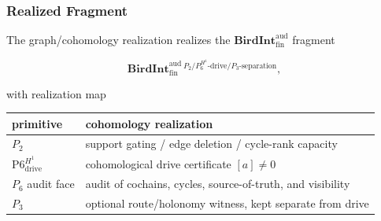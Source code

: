 \documentclass[11pt]{article}
\theoremstyle{definition}
\begin{document}
\subsubsection{Realized Fragment}

The graph/cohomology realization realizes the \(\mathbf{BirdInt}^{\mathrm{aud}}_{\mathrm{fin}}\) fragment

\[
\mathbf{BirdInt}^{\mathrm{aud}}_{\mathrm{fin}}{}^{\,P_{2}/P_{6}^{H^{1}}\text{-drive}/P_{3}\text{-separation}},
\]

with realization map

\begin{longtable}[]{@{}ll@{}}
\toprule
\begin{minipage}[b]{0.26\columnwidth}\raggedright
primitive\strut
\end{minipage} & \begin{minipage}[b]{0.68\columnwidth}\raggedright
cohomology realization\strut
\end{minipage}\tabularnewline
\midrule
\endhead
\begin{minipage}[t]{0.26\columnwidth}\raggedright
\(P_{2}\)\strut
\end{minipage} & \begin{minipage}[t]{0.68\columnwidth}\raggedright
support gating / edge deletion / cycle-rank capacity\strut
\end{minipage}\tabularnewline
\begin{minipage}[t]{0.26\columnwidth}\raggedright
\(\mathrm{P6}_{\mathrm{drive}}^{H^1}\)\strut
\end{minipage} & \begin{minipage}[t]{0.68\columnwidth}\raggedright
cohomological drive certificate \([a]\neq 0\)\strut
\end{minipage}\tabularnewline
\begin{minipage}[t]{0.26\columnwidth}\raggedright
\(P_{6}\) audit face\strut
\end{minipage} & \begin{minipage}[t]{0.68\columnwidth}\raggedright
audit of cochains, cycles, source-of-truth, and visibility\strut
\end{minipage}\tabularnewline
\begin{minipage}[t]{0.26\columnwidth}\raggedright
\(P_{3}\)\strut
\end{minipage} & \begin{minipage}[t]{0.68\columnwidth}\raggedright
optional route/holonomy witness, kept separate from drive\strut
\end{minipage}\tabularnewline

\end{longtable}
\end{document}
